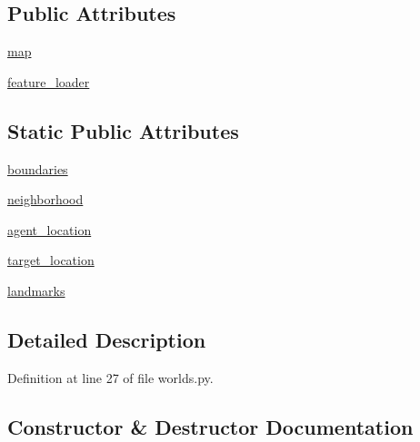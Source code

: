 \subsection*{Public Attributes}
\begin{DoxyCompactItemize}
\item 
\hyperlink{classparlai_1_1tasks_1_1talkthewalk_1_1worlds_1_1Simulator_a2e496f42b19dac1ad35d9604f63dd8e0}{map}
\item 
\hyperlink{classparlai_1_1tasks_1_1talkthewalk_1_1worlds_1_1Simulator_accbc4219f01217f9599c6560e34016fd}{feature\+\_\+loader}
\end{DoxyCompactItemize}
\subsection*{Static Public Attributes}
\begin{DoxyCompactItemize}
\item 
\hyperlink{classparlai_1_1tasks_1_1talkthewalk_1_1worlds_1_1Simulator_afb9280ec4243b403e5b8d7cf694dddd2}{boundaries}
\item 
\hyperlink{classparlai_1_1tasks_1_1talkthewalk_1_1worlds_1_1Simulator_a79e2dd5fa3d217ff8e909ef731e38314}{neighborhood}
\item 
\hyperlink{classparlai_1_1tasks_1_1talkthewalk_1_1worlds_1_1Simulator_a149433c72afebe5995a02d03133d4507}{agent\+\_\+location}
\item 
\hyperlink{classparlai_1_1tasks_1_1talkthewalk_1_1worlds_1_1Simulator_a3d22320d10a2fea9c185be6a0e7bc1fb}{target\+\_\+location}
\item 
\hyperlink{classparlai_1_1tasks_1_1talkthewalk_1_1worlds_1_1Simulator_a50902f5af0b1faf0225d13593436b393}{landmarks}
\end{DoxyCompactItemize}


\subsection{Detailed Description}


Definition at line 27 of file worlds.\+py.



\subsection{Constructor \& Destructor Documentation}
\mbox{\label{classparlai_1_1tasks_1_1talkthewalk_1_1worlds_1_1Simulator_af0dd9259b1847530dd06e97c004b4992}} 
